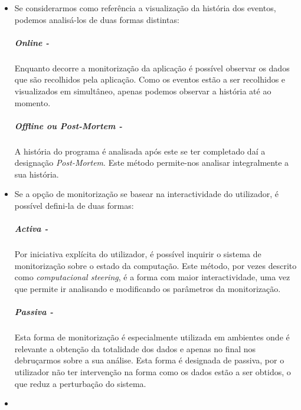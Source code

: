 \begin{itemize}
 \item 


Se considerarmos como referência a visualização da história dos eventos, podemos analisá-los de duas formas distintas:

 
\subparagraph*{Online -}
Enquanto decorre a monitorização da aplicação é possível observar os dados que são recolhidos pela aplicação.
Como os eventos estão a ser recolhidos e visualizados em simultâneo, apenas podemos observar a história até ao momento.

\subparagraph*{Offline ou \textit{Post-Mortem} - }

A história do programa é analisada após este se ter completado daí a designação \textit{Post-Mortem}.
Este método permite-nos analisar integralmente a sua história.

\item

Se a opção de monitorização se basear na interactividade do utilizador, é possível defini-la de duas formas:

 \subparagraph*{Activa - }

Por iniciativa explícita do utilizador, é possível inquirir o sistema de monitorização sobre o estado da computação.
Este método, por vezes descrito como \textit{computacional steering}, é a forma com maior interactividade, uma vez que permite ir analisando e modificando os parâmetros da monitorização.


\subparagraph*{Passiva - }
Esta forma de monitorização é especialmente utilizada em ambientes onde é relevante a obtenção da totalidade dos dados e apenas no final nos debruçarmos sobre a sua análise.
Esta forma é designada de passiva, por o utilizador não ter intervenção na forma como os dados estão a ser obtidos, o que reduz a perturbação do sistema. 
\item


\end{itemize}
